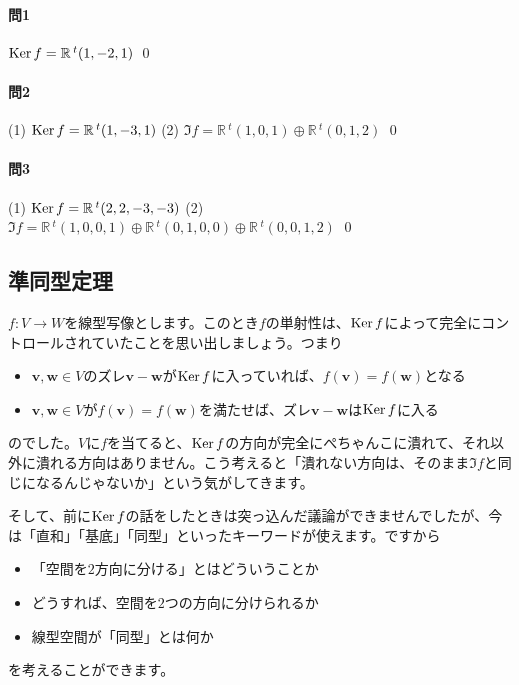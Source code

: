 \paragraph{問1} $\operatorname{Ker} f = \mathbb{R}\,{}^t(1, -2, 1)$ \qed

\paragraph{問2} (1) $\operatorname{Ker} f = \mathbb{R}\,{}^t(1, -3, 1)$ (2) $\Im f = \mathbb{R}\,{}^t(1, 0, 1) \oplus \mathbb{R}\,{}^t(0, 1, 2)$ \qed

\paragraph{問3} (1) $\operatorname{Ker} f = \mathbb{R}\,{}^t(2, 2, -3, -3)$ (2) $\Im f = \mathbb{R}\,{}^t(1, 0, 0 ,1) \oplus \mathbb{R}\,{}^t(0, 1, 0 ,0) \oplus \mathbb{R}\,{}^t(0, 0, 1 ,2)$ \qed

\subsection{準同型定理}

$f\colon V\rightarrow W$を線型写像とします。このとき$f$の単射性は、$\operatorname{Ker} f$によって完全にコントロールされていたことを思い出しましょう。つまり
\begin{itemize}
\item $\bm{v}, \bm{w} \in V$のズレ$\bm{v} - \bm{w}$が$\operatorname{Ker} f$に入っていれば、$f(\bm{v}) = f(\bm{w})$となる
\item $\bm{v}, \bm{w} \in V$が$f(\bm{v}) = f(\bm{w})$を満たせば、ズレ$\bm{v} - \bm{w}$は$\operatorname{Ker} f$に入る
\end{itemize}
のでした。$V$に$f$を当てると、$\operatorname{Ker} f$の方向が完全にぺちゃんこに潰れて、それ以外に潰れる方向はありません。こう考えると「潰れない方向は、そのまま$\Im f$と同じになるんじゃないか」という気がしてきます。

そして、前に$\operatorname{Ker} f$の話をしたときは突っ込んだ議論ができませんでしたが、今は「直和」「基底」「同型」といったキーワードが使えます。ですから
\begin{itemize}
\item 「空間を$2$方向に分ける」とはどういうことか
\item どうすれば、空間を$2$つの方向に分けられるか
\item 線型空間が「同型」とは何か
\end{itemize}
を考えることができます。

